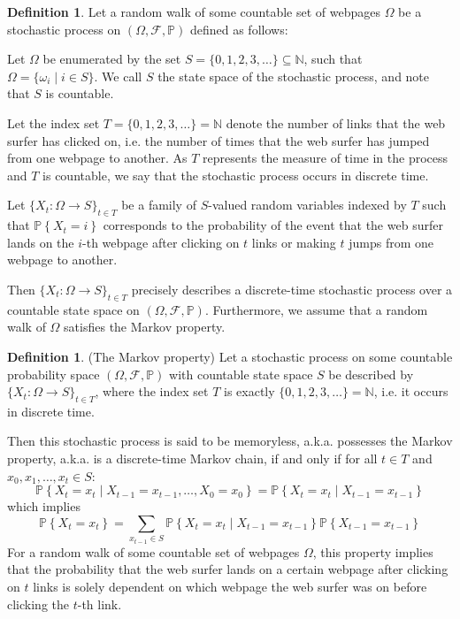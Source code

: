 \documentclass[11pt]{article}
\theoremstyle{definition}
\newtheorem{definition}[theorem]{Definition}
\newcommand{\N}{\mathbb{N}}
\newcommand{\p}[1]{\mathbb{P}\left\{#1\right\}}
\begin{document}
\begin{definition}
    Let a random walk of some countable set of webpages $\Omega$ be a stochastic process on $(\Omega, \mathcal{F}, \mathbb{P})$ defined as follows:

    Let $\Omega$ be enumerated by the set $S = \{0, 1, 2, 3, \ldots\} \subseteq \N$, such that $\Omega = \{\omega_i \mid i \in S\}$.
    We call $S$ the state space of the stochastic process, and note that $S$ is countable.

    Let the index set $T = \{0, 1, 2, 3, \ldots \} = \N$ denote the number of links that the web surfer has clicked on, i.e. the number of times that the web surfer has jumped from one webpage to another.
    As $T$ represents the measure of time in the process and $T$ is countable, we say that the stochastic process occurs in discrete time.
    
    Let $\{X_t : \Omega \to S\}_{t \in T}$ be a family of $S$-valued random variables indexed by $T$ such that
    $\p{X_t = i}$ corresponds to the probability of the event that the web surfer lands on the $i$-th webpage after clicking on $t$ links or making $t$ jumps from one webpage to another.

    Then $\{X_t : \Omega \to S\}_{t \in T}$ precisely describes a discrete-time stochastic process over a countable state space on $(\Omega, \mathcal{F}, \mathbb{P})$.
    Furthermore, we assume that a random walk of $\Omega$ satisfies the Markov property.
\end{definition}

\begin{definition}
    (The Markov property) Let a stochastic process on some countable probability space $(\Omega, \mathcal{F}, \mathbb{P})$
    with countable state space $S$ be described by $\{X_t : \Omega \to S\}_{t \in T}$,
    where the index set $T$ is exactly $\{0, 1, 2, 3, \ldots \} = \N$,
    i.e. it occurs in discrete time.

    Then this stochastic process is said to be memoryless, a.k.a. possesses the Markov property, a.k.a. is a discrete-time Markov chain, if and only if for all $t \in T$ and $x_0, x_1, \ldots, x_t \in S$:
    $$\p{X_t = x_t \mid X_{t-1} = x_{t-1}, \ldots, X_0 = x_0} = \p{X_t = x_t \mid X_{t-1} = x_{t-1}}$$
    which implies
    $$\p{X_t = x_t} = \sum_{x_{t-1} \in S} \p{X_t = x_t \mid X_{t-1} = x_{t-1}} \p{X_{t-1} = x_{t-1}}$$
    For a random walk of some countable set of webpages $\Omega$, this property implies that 
    the probability that the web surfer lands on a certain webpage after clicking on $t$ links is solely dependent on
    which webpage the web surfer was on before clicking the $t$-th link.
\end{definition}
\end{document}
